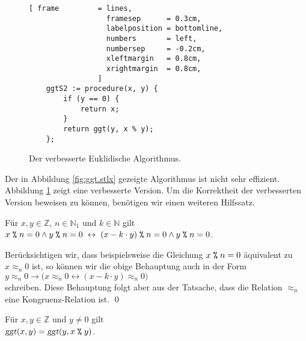 \begin{figure}[!ht]
\centering
\begin{Verbatim}[ frame         = lines, 
                  framesep      = 0.3cm, 
                  labelposition = bottomline,
                  numbers       = left,
                  numbersep     = -0.2cm,
                  xleftmargin   = 0.8cm,
                  xrightmargin  = 0.8cm,
                ]
    ggtS2 := procedure(x, y) {
        if (y == 0) {
            return x;
        }
        return ggt(y, x % y); 
    };
\end{Verbatim}
\vspace*{-0.3cm}
\caption{Der verbesserte Euklidische Algorithmus.}
\label{fig:ggt2.stlx}
\end{figure}

Der in Abbildung \ref{fig:ggt.stlx} gezeigte Algorithmus ist nicht sehr effizient. 
Abbildung \ref{fig:ggt2.stlx} zeigt eine verbesserte Version.  Um die Korrektheit der verbesserten
Version beweisen zu k\"{o}nnen, ben\"{o}tigen wir einen weiteren Hilfssatz.

\begin{Lemma} F\"{u}r $x,y \in \mathbb{Z}$, $n \in \mathbb{N}_1$ und $k \in \mathbb{N}$ gilt
\\[0.2cm]
\hspace*{1.3cm}
  $x \;\texttt{\%}\; n = 0 \wedge y \;\texttt{\%}\; n = 0 \;\leftrightarrow\; 
   (x - k \cdot y) \;\texttt{\%}\; n = 0 \wedge y \;\texttt{\%}\; n = 0
  $.
\end{Lemma}

\proof
Ber\"{u}cksichtigen wir, dass beispielsweise die Gleichung $x \;\texttt{\%}\; n = 0$ \"{a}quivalent zu 
$x \approx_n 0$ ist, so k\"{o}nnen wir die obige Behauptung auch in der Form
\\[0.2cm]
\hspace*{1.3cm}
$y \approx_n 0 \rightarrow \bigl(x \approx_n 0 \leftrightarrow (x - k \cdot y) \approx_n 0\bigr)$
\\[0.2cm]
schreiben.  Diese Behauptung folgt aber aus der
Tatsache, dass die Relation $\approx_n$ eine Kongruenz-Relation ist. \qed


\begin{Korollar} \label{korollar:ggt2}
F\"{u}r $x,y \in \mathbb{Z}$ und $y \not= 0$ gilt
\\[0.2cm]
\hspace*{1.3cm}
$\textsl{ggt}(x,y) = \textsl{ggt}(y, x \;\texttt{\%}\; y)$.
\end{Korollar}

